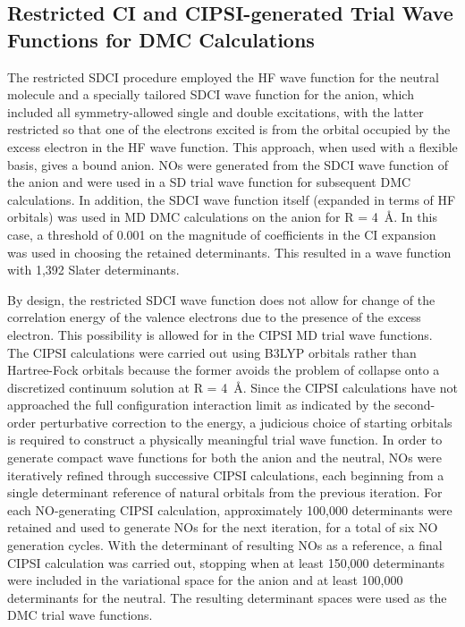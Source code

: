 \subsection{Restricted CI and CIPSI-generated Trial Wave Functions for DMC Calculations}
\label{subsec:rSDCI}
The restricted SDCI procedure employed the HF wave function for the neutral molecule and a specially tailored SDCI wave function for the anion, which included all symmetry-allowed single and double excitations, with the latter restricted so that one of the electrons excited is from the orbital occupied by the excess electron in the HF wave function.
This approach, when used with a flexible basis, gives a bound anion.
NOs were generated from the SDCI wave function of the anion and were used in a SD trial wave function for subsequent DMC calculations.
In addition, the SDCI wave function itself (expanded in terms of HF orbitals) was used in MD DMC calculations on the anion for R = \SI{4}{\angstrom}. 
In this case, a threshold of 0.001 on the magnitude of coefficients in the CI expansion was used in choosing the retained determinants.
This resulted in a wave function with 1,392 Slater determinants.

By design, the restricted SDCI wave function does not allow for change of the correlation energy of the valence electrons due to the presence of the excess electron.
This possibility is allowed for in the CIPSI MD trial wave functions.
The CIPSI calculations were carried out using B3LYP orbitals rather than Hartree-Fock orbitals because the former avoids the problem of collapse onto a discretized continuum solution at R =  \SI{4}{\angstrom}.\cite{B3,LYP,VWN}
Since the CIPSI calculations have not approached the full configuration interaction limit as indicated by the second-order perturbative correction to the energy, a judicious choice of starting orbitals is required to construct a physically meaningful trial wave function.
In order to generate compact wave functions for both the anion and the neutral, NOs were iteratively refined through successive CIPSI calculations, each beginning from a single determinant reference of natural orbitals from the previous iteration.
For each NO-generating CIPSI calculation, approximately 100,000 determinants were retained and used to generate NOs for the next iteration, for a total of six NO generation cycles. 
With the determinant of resulting NOs as a reference, a final CIPSI calculation was carried out, stopping when at least 150,000 determinants were included in the variational space for the anion and at least 100,000 determinants for the neutral. 
The resulting determinant spaces were used as the DMC trial wave functions.

